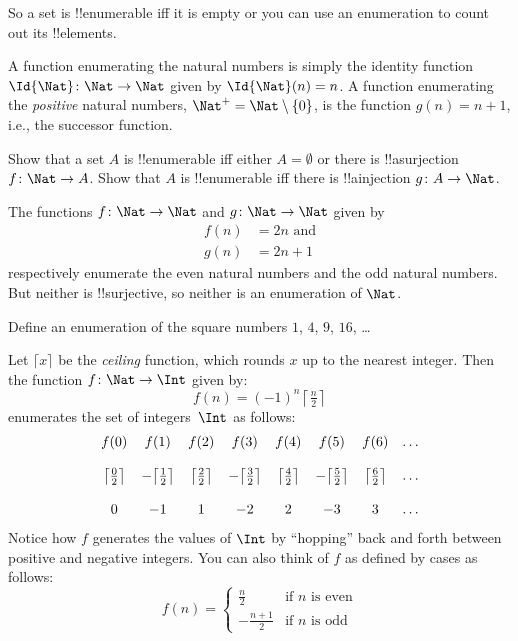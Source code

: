 \begin{explain}
So a set is !!{enumerable} iff it is empty or you can use an
enumeration to count out its !!{element}s.
\end{explain}

\begin{ex}
A function enumerating the natural numbers is simply the identity
function $\Id{\Nat} \colon \Nat \to \Nat$ given by $\Id{\Nat}(n) = n$. A
function enumerating the \emph{positive} natural numbers, $\Nat^+ =
\Nat \setminus \{0\}$, is the function $g(n) = n + 1$, i.e., the
successor function.
\end{ex}

\begin{prob}
Show that a set $A$ is !!{enumerable} iff either $A = \emptyset$ or
there is !!a{surjection} $f\colon \Nat \to A$. Show that $A$ is
!!{enumerable} iff there is !!a{injection} $g\colon A \to \Nat$. 
\end{prob}

\begin{ex}
The functions $f\colon \Nat \to \Nat$ and $g \colon \Nat \to \Nat$
given by
\begin{align*}
  f(n) & = 2n \text{ and}\\
  g(n) & = 2n+1
\end{align*}
respectively enumerate the even natural numbers and the odd natural
numbers. But neither is !!{surjective}, so neither is an enumeration
of $\Nat$.
\end{ex}

\begin{prob}
Define an enumeration of the square numbers $1$, $4$, $9$, $16$, \dots
\end{prob}

\begin{ex}
Let $\lceil x \rceil$ be the \emph{ceiling} function, which rounds $x$
up to the nearest integer. Then the function $f \colon \Nat \to \Int$
given by:
\[
  f(n) = (-1)^{n} \left\lceil\tfrac{n}{2}\right\rceil
\]
enumerates the set of
integers~$\Int$ as follows:
\[
\begin{array}{c c c c c c c c}
f(0) & f(1) & f(2) & f(3) & f(4) & f(5) & f(6) & \dots \\ \\
\big\lceil \tfrac{0}{2} \big\rceil & -\big\lceil \tfrac{1}{2}\big\rceil &  \big\lceil \tfrac{2}{2} \big\rceil & -\big\lceil \tfrac{3}{2} \big\rceil & \big\lceil \tfrac{4}{2} \big\rceil  & -\big\lceil \tfrac{5}{2}\big\rceil & \big\lceil \tfrac{6}{2} \big\rceil & \dots \\ \\
0 & -1 & 1 & -2 & 2 & -3 & 3& \dots
\end{array}
\]
Notice how $f$ generates the values of $\Int$ by ``hopping'' back and
forth between positive and negative integers. You can also think of
$f$ as defined by cases as follows:
\[
f(n) = \begin{cases}
  \frac{n}{2} & \text{if $n$ is even}\\
  -\frac{n+1}{2} & \text{if $n$ is odd}
  \end{cases}
\]
\end{ex}

